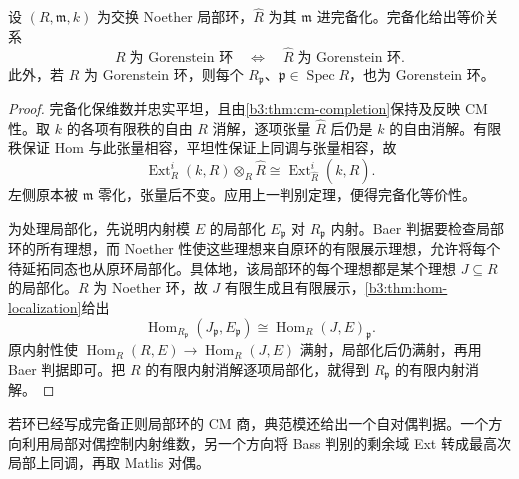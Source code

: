 \begin{proposition}\label{b3:prop:gorenstein-completion-localization}
	设 \((R,\mathfrak m,k)\) 为交换 Noether 局部环，\(\widehat R\) 为其 \(\mathfrak m\) 进完备化。完备化给出等价关系
	\[
		R\;\text{为 Gorenstein 环}\quad\Longleftrightarrow\quad \widehat R\;\text{为 Gorenstein 环}.
	\]
	此外，若 \(R\) 为 Gorenstein 环，则每个 \(R_{\mathfrak p}\)、\(\mathfrak p\in\operatorname{Spec}R\)，也为 Gorenstein 环。
\end{proposition}
\begin{proof}
	完备化保维数并忠实平坦，且由\cref{b3:thm:cm-completion}保持及反映 CM 性。取 \(k\) 的各项有限秩的自由 \(R\) 消解，逐项张量 \(\widehat R\) 后仍是 \(k\) 的自由消解。有限秩保证 Hom 与此张量相容，平坦性保证上同调与张量相容，故
	\[
		\operatorname{Ext}_R^i(k,R)\otimes_R\widehat R \cong\operatorname{Ext}_{\widehat R}^i(k,\widehat R).
	\]
	左侧原本被 \(\mathfrak m\) 零化，张量后不变。应用上一判别定理，便得完备化等价性。

	为处理局部化，先说明内射模 \(E\) 的局部化 \(E_{\mathfrak p}\) 对 \(R_{\mathfrak p}\) 内射。Baer 判据要检查局部环的所有理想，而 Noether 性使这些理想来自原环的有限展示理想，允许将每个待延拓同态也从原环局部化。具体地，该局部环的每个理想都是某个理想 \(J\subseteq R\) 的局部化。\(R\) 为 Noether 环，故 \(J\) 有限生成且有限展示，\cref{b3:thm:hom-localization}给出
	\[
		\operatorname{Hom}_{R_{\mathfrak p}}(J_{\mathfrak p},E_{\mathfrak p}) \cong\operatorname{Hom}_R(J,E)_{\mathfrak p}.
	\]
	原内射性使 \(\operatorname{Hom}_R(R,E)\to\operatorname{Hom}_R(J,E)\) 满射，局部化后仍满射，再用 Baer 判据即可。把 \(R\) 的有限内射消解逐项局部化，就得到 \(R_{\mathfrak p}\) 的有限内射消解。
\end{proof}

若环已经写成完备正则局部环的 CM 商，典范模还给出一个自对偶判据。一个方向利用局部对偶控制内射维数，另一个方向将 Bass 判别的剩余域 Ext 转成最高次局部上同调，再取 Matlis 对偶。


